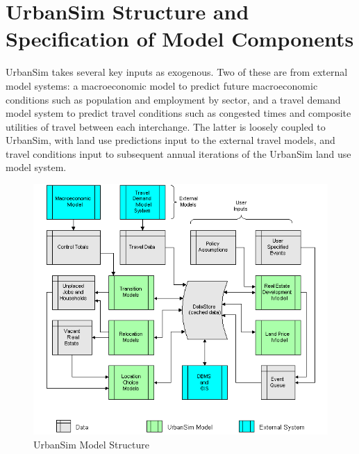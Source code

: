 

\chapter{UrbanSim Structure and Specification of Model Components}
\label{chapter:models}

UrbanSim takes several key inputs as exogenous.  Two of these are
from external model systems: a macroeconomic model to predict
future macroeconomic conditions such as population and employment
by sector, and a travel demand model system to predict travel
conditions such as congested times and composite utilities of
travel between each interchange.  The latter is loosely coupled to
UrbanSim, with land use predictions input to the external travel
models, and travel conditions input to subsequent annual
iterations of the UrbanSim land use model system.

\begin{figure}
\begin{center}
\includegraphics[width=6.5in]{images/flownew.png}
\caption{UrbanSim Model Structure} \label{figure:USStruct}
\end{center}
\end{figure}

